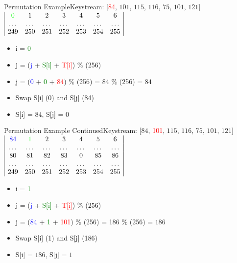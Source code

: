 \documentclass[
	aspectratio=169,	%
	onlytextwidth,		%
	t,					%
	]{beamer}
\begin{document}
\begin{frame}{Permutation Example}{Keystream: [\textcolor{red} {84}, $101$, $115$, $116$, $75$, $101$, $121$]}
	\medskip
	$\begin{array}{|ccccccc|}
		\textcolor{green}{0} & 1 & 2 & 3 & 4 & 5 & 6 \\
		\dots & \dots & \dots & \dots & \dots & \dots & \dots \\
		249 & 250 & 251 & 252 & 253 & 254 & 255 \\
	\end{array}$
	\medskip
	\begin{itemize}
		\item i = \textcolor{green}{0}
		\item j = (\textcolor{blue} {j} + \textcolor{green}{S[i]} + \textcolor{red}{T[i]}) $\%$ (256)
		\item j = (\textcolor{blue} {0} + \textcolor{green} {0} + \textcolor{red} {84}) $\%$ (256) = 84 $\%$ (256) = $84$
		\item Swap S[i] (0) and S[j] (84)
		\item S[i] = $84$, S[j] = $0$
	\end{itemize}
\end{frame}

\begin{frame}{Permutation Example Continued}{Keystream: [$84$, \textcolor{red} {101}, $115$, $116$, $75$, $101$, $121$]}
	$\begin{array}{|ccccccc|}
		\textcolor{blue}{84} & \textcolor{green}{1} & 2 & 3 & 4 & 5 & 6 \\
		\dots & \dots & \dots & \dots & \dots & \dots & \dots \\
		80 & 81 & 82 & 83 & 0 & 85 & 86 \\
		\dots & \dots & \dots & \dots & \dots & \dots & \dots \\
		249 & 250 & 251 & 252 & 253 & 254 & 255 \\
	\end{array}$
	\begin{itemize}
		\item i = \textcolor{green}{1}
		\item j = (\textcolor{blue} {j} + \textcolor{green}{S[i]} + \textcolor{red}{T[i]}) $\%$ (256)
		\item j = (\textcolor{blue} {84} + \textcolor{green} {1} + \textcolor{red} {101}) $\%$ (256) = 186 $\%$ (256) = $186$
		\item Swap S[i] (1) and S[j] (186)
		\item S[i] = $186$, S[j] = $1$
	\end{itemize}
\end{frame}
\end{document}
